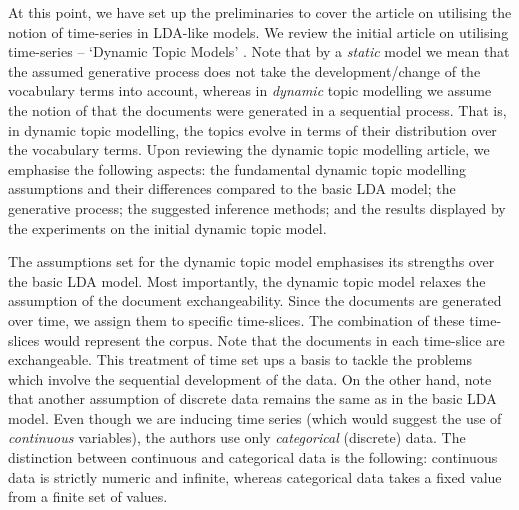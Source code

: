 \documentclass{mprop}
\begin{document}
\par At this point, we have set up the preliminaries to cover the article on utilising the notion of time-series in LDA-like models. We review the initial article on utilising time-series -- `Dynamic Topic Models' \cite{blei_2006}. Note that by a \textit{static} model we mean that the assumed generative process does not take the development/change of the vocabulary terms into account, whereas in \textit{dynamic} topic modelling we assume the notion of that the documents were generated in a sequential process. That is, in dynamic topic modelling, the topics evolve in terms of their distribution over the vocabulary terms. Upon reviewing the dynamic topic modelling article, we emphasise the following aspects: the fundamental dynamic topic modelling assumptions and their differences compared to the basic LDA model; the generative process; the suggested inference methods; and the results displayed by the experiments on the initial dynamic topic model.

\par The assumptions set for the dynamic topic model emphasises its strengths over the basic LDA model. Most importantly, the dynamic topic model relaxes the assumption of the document exchangeability. Since the documents are generated over time, we assign them to specific time-slices. The combination of these time-slices would represent the corpus. Note that the documents in each time-slice are exchangeable. This treatment of time set ups a basis to tackle the problems which involve the sequential development of the data. On the other hand, note that another assumption of discrete data remains the same as in the basic LDA model. Even though we are inducing time series (which would suggest the use of \textit{continuous} variables), the authors use only \textit{categorical} (discrete) data. The distinction between continuous and categorical data is the following: continuous data is strictly numeric and infinite, whereas categorical data takes a fixed value from a finite set of values. 
\end{document}
